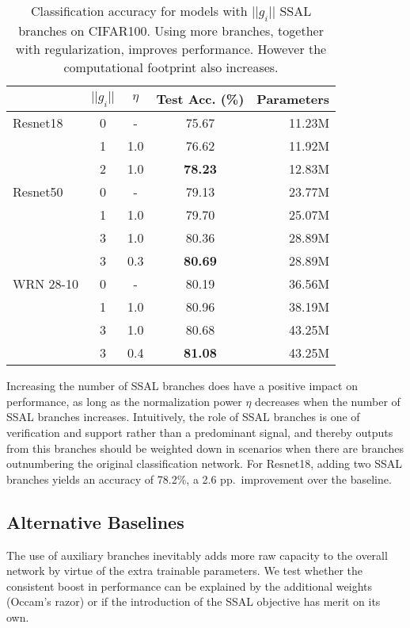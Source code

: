 \documentclass[10pt,twocolumn,letterpaper]{article}
\begin{document}
\begin{table}[t]
\centering
\begin{tabular}{@{}lcccr@{}}
\toprule
          & $||g_i||$ & $\eta$ & Test Acc. (\%) & Parameters \\ \midrule
Resnet18  & 0         & -      & 75.67              & 11.23M     \\
          & 1         & 1.0    & 76.62             & 11.92M     \\
          & 2         & 1.0    & \textbf{78.23}     & 12.83M     \\ \midrule
Resnet50  & 0         & -      & 79.13              & 23.77M     \\
          & 1         & 1.0    & 79.70              & 25.07M     \\
          & 3         & 1.0    & 80.36              & 28.89M     \\
          & 3         & 0.3    & \textbf{80.69}     & 28.89M     \\ \midrule
WRN 28-10 & 0         & -      & 80.19              & 36.56M     \\
          & 1         & 1.0    & 80.96              & 38.19M     \\
          & 3         & 1.0    & 80.68              & 43.25M     \\
          & 3         & 0.4    & \textbf{81.08}     & 43.25M     \\ \bottomrule
\end{tabular}
\caption{Classification accuracy for models with $||g_i||$ SSAL branches on CIFAR100. Using more branches, together with regularization, improves performance. However the computational footprint also increases.}
\label{tab:cifar100number}
\end{table}

Increasing the number of SSAL branches does have a positive impact on performance, as long as the normalization power $\eta$ decreases when the number of SSAL branches increases.
Intuitively, the role of SSAL branches is one of verification and support rather than a predominant signal, and thereby outputs from this branches should be weighted down in scenarios when there are branches outnumbering the original classification network.
For Resnet18, adding two SSAL branches yields an accuracy of 78.2\%, a 2.6 pp.~improvement over the baseline.


\subsection{Alternative Baselines}
\label{subsec:baselines}
The use of auxiliary branches inevitably adds more raw capacity to the overall network by virtue of the extra trainable parameters.
We test whether the consistent boost in performance can be explained by the additional weights (Occam's razor) or if the introduction of the SSAL objective has merit on its own.
\end{document}
